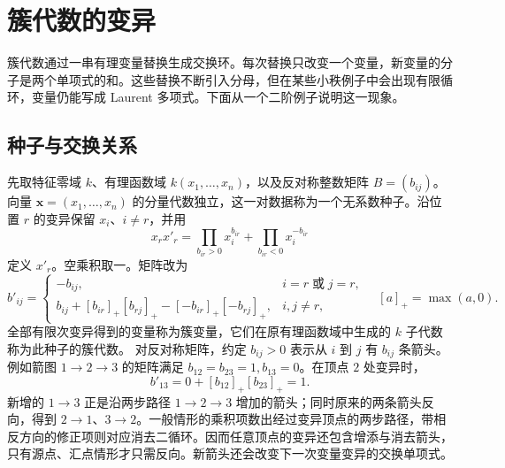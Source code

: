 %
%
\section{簇代数的变异}
\label{b5:sec:B02}

簇代数通过一串有理变量替换生成交换环。每次替换只改变一个变量，新变量的分子是两个单项式的和。这些替换不断引入分母，但在某些小秩例子中会出现有限循环，变量仍能写成 Laurent 多项式。下面从一个二阶例子说明这一现象。

\subsection{种子与交换关系}
\label{b5:subsec:B02:01}

先取特征零域 \(k\)、有理函数域 \(k(x_1,\ldots,x_n)\)，以及反对称整数矩阵 \(B=(b_{ij})\)。向量 \(\mathbf x=(x_1,\ldots,x_n)\) 的分量代数独立，这一对数据称为一个无系数种子。沿位置 \(r\) 的变异保留 \(x_i\)、\(i\ne r\)，并用
\[
	x_rx'_r=\prod_{b_{ir}>0}x_i^{b_{ir}} +\prod_{b_{ir}<0}x_i^{-b_{ir}}
\]
定义 \(x'_r\)。空乘积取一。矩阵改为
\[
	b'_{ij}=
	\begin{cases}
		-b_{ij},&i=r\;\text{或}\;j=r,\\
		b_{ij}+[b_{ir}]_+[b_{rj}]_+-[-b_{ir}]_+[-b_{rj}]_+,&i,j\ne r,
	\end{cases}
	\quad [a]_+=\max(a,0).
\]
全部有限次变异得到的变量称为簇变量，它们在原有理函数域中生成的 \(k\) 子代数称为此种子的簇代数。 对反对称矩阵，约定 \(b_{ij}>0\) 表示从 \(i\) 到 \(j\) 有 \(b_{ij}\) 条箭头。例如箭图 \(1\to2\to3\) 的矩阵满足 \(b_{12}=b_{23}=1,b_{13}=0\)。在顶点 \(2\) 处变异时，
\[
	b'_{13}=0+[b_{12}]_+[b_{23}]_+=1.
\]
新增的 \(1\to3\) 正是沿两步路径 \(1\to2\to3\) 增加的箭头；同时原来的两条箭头反向，得到 \(2\to1\)、\(3\to2\)。一般情形的乘积项数出经过变异顶点的两步路径，带相反方向的修正项则对应消去二循环。因而任意顶点的变异还包含增添与消去箭头，只有源点、汇点情形才只需反向。新箭头还会改变下一次变量变异的交换单项式。


